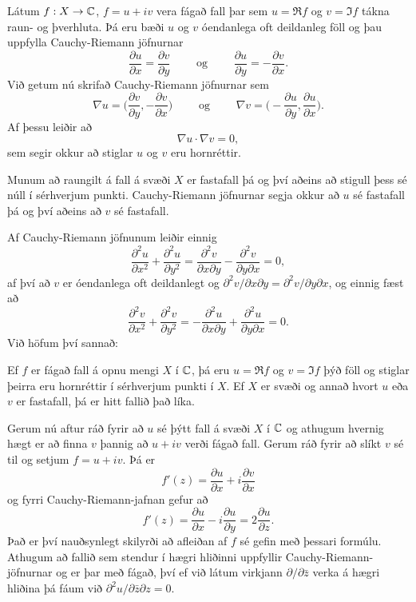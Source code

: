 Látum $f: X\to {\mathbb C}$, $f=u+iv$ vera fágað fall þar sem $u=\Re f$
og $v=\Im f$ tákna raun- og þverhluta.  Þá eru bæði $u$ og $v$
óendanlega oft deildanleg föll og þau uppfylla Cauchy-Riemann 
jöfnurnar
$$
\dfrac{\partial u}{\partial x}
=\dfrac{\partial v}{\partial y} \qquad \text{ og } \qquad
\dfrac{\partial u}{\partial y}
=-\dfrac{\partial v}{\partial x}.
$$
Við getum nú skrifað Cauchy-Riemann jöfnurnar sem
$$
\nabla u=\big(\dfrac{\partial v}{\partial y},-\dfrac{\partial
v}{\partial x}\big) \qquad \text{ og } \qquad
\nabla v=\big(-\dfrac{\partial u}{\partial y},\dfrac{\partial
u}{\partial x}\big). 
$$
Af þessu leiðir að 
$$
\nabla u\cdot \nabla v=0,
$$
sem segir okkur að stiglar $u$ og $v$ eru hornréttir.

Munum að raungilt á fall á svæði $X$ er fastafall þá og því aðeins að
stigull þess sé núll í sérhverjum punkti.  Cauchy-Riemann jöfnurnar
segja okkur að $u$ sé fastafall þá og því aðeins að $v$ sé fastafall.

Af Cauchy-Riemann jöfnunum leiðir einnig
$$
\dfrac {\partial^2 u}{\partial x^2}+  
\dfrac {\partial^2 u}{\partial y^2}
=\dfrac{\partial^2 v}{\partial x\partial y}  
-\dfrac{\partial^2 v}{\partial y\partial x}=0,  
$$
af því að $v$ er óendanlega oft deildanlegt og
$\partial^2 v/\partial x\partial y=\partial^2 v/\partial y\partial x$,
og einnig fæst að
$$
\dfrac {\partial^2 v}{\partial x^2}+  
\dfrac {\partial^2 v}{\partial y^2}
=-\dfrac{\partial^2 u}{\partial x\partial y}  
+\dfrac{\partial^2 u}{\partial y\partial x}=0.  
$$
Við höfum því sannað:

\begin{sex}  Ef $f$ er fágað fall á opnu mengi $X$ í ${\mathbb C}$, þá eru 
$u=\Re f$ og $v=\Im f$ þýð föll og stiglar þeirra eru hornréttir í
sérhverjum punkti í $X$.
Ef $X$ er svæði og annað hvort $u$ eða $v$ er fastafall, þá er hitt
fallið það líka.
\end{sex}


Gerum nú aftur ráð fyrir að $u$ sé þýtt fall á svæði $X$ í ${\mathbb C}$
og athugum hvernig hægt er að finna $v$ þannig að $u+iv$ verði fágað
fall.  Gerum ráð fyrir að slíkt $v$ sé til og setjum $f=u+iv$.  Þá
er 
$$
f'(z)=\dfrac{\partial u}{\partial x}+i\dfrac{\partial v}{\partial x}
$$
og fyrri Cauchy-Riemann-jafnan gefur að 
$$
f'(z)=\dfrac{\partial u}{\partial x}-i\dfrac{\partial u}{\partial y}
=2\dfrac{\partial u}{\partial z}.
$$ 
Það er því nauðsynlegt skilyrði að afleiðan af $f$ sé gefin með
þessari formúlu. Athugum að fallið sem stendur í hægri hliðinni
uppfyllir Cauchy-Riemann-jöfnurnar og er þar með fágað, 
því ef við látum virkjann
$\partial/\partial \bar z$ verka á hægri hliðina þá fáum við
$\partial^2u/\partial\bar z \partial z=0$.


